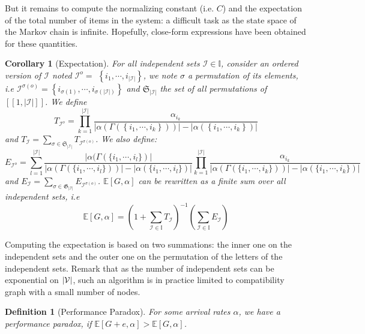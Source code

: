 \documentclass{llncs}
\newtheorem{defin}     {Definition}
\newtheorem{cor}[theo]{Corollary}
\begin{document}
But it remains to compute the normalizing constant (i.e. $C$) and the expectation of the total number of items
 in the system: a difficult task as the state space of the Markov chain is infinite. 
Hopefully, close-form expressions have been obtained for these quantities. 
\begin{cor} [Expectation]\label{cor:exp} \cite{CDFB21}
For all independent sets $\mathcal{I} \in \mathbb{I}$, consider an ordered version of $\mathcal{I}$ noted $\mathcal{I}^o=$ $\left\{i_1, \cdots, i_{|\mathcal{I}|}\right\}$, we note $\sigma$ a permutation of its elements, i.e $\mathcal{I}^{\sigma(o)}=\left\{i_{\sigma(1)}, \cdots, i_{\sigma(|\mathcal{I}|)}\right\}$ and $\mathfrak{S}_{|\mathcal{I}|}$ the set of all permutations of $[\![ 1,|\mathcal{I}| ]\!]$. We define $$
T_{\mathcal{I}^o}=\prod_{k=1}^{|\mathcal{I}|} \frac{\alpha_{i_k}}
{\left| \alpha(\Gamma (\left\{i_1, \cdots, i_k\right\}))\right|
-\left|\alpha(\left\{i_1, \cdots, i_k\right\})\right|}
$$ and $T_{\mathcal{I}}=\sum_{\sigma \in \mathfrak{S}_{|\mathcal{I}|}} T_{\mathcal{I}^{\sigma(o)}}$. 
We also define: 
\[
E_{\mathcal{I}^o}=\sum_{l=1}^{|\mathcal{I}|} 
\frac{\left|\alpha(\Gamma(\{i_1, \cdots, i_l\})\right|}{\left| \alpha(\Gamma( \{ i_1, \cdots, i_l \})) \right|-\left|\alpha(\{i_1, \cdots, i_l\})\right|} \prod_{k=1}^{|\mathcal{I}|} \frac{\alpha_{i_k}}{\left|\alpha(\Gamma(\{i_1, \cdots, i_k\})) \right|-\left|\alpha(\{i_1, \cdots, i_k\}) \right|}
\]
and $E_{\mathcal{I}}=\sum_{\sigma \in \mathfrak{G}_{|\mathcal{I}|}} E_{\mathcal{I}^{\sigma(o)}}$. 
$\mathbb{E}[G, \alpha ]$  can be rewritten as a finite sum over all independent sets, i.e 
\begin{equation}\label{eq:exceptio}
\mathbb{E}[G,\alpha]=\left(1+\sum_{\mathcal{I} \in \mathbb{I}}T_{\mathcal{I}}\right)^{-1}\left(\sum_{\mathcal{I}\in \mathbb{I}} E_{\mathcal{I}}\right)
\end{equation}
\end{cor}

Computing the expectation is based on two summations: the inner one on the
independent sets and the outer one on the permutation of the letters of the independent sets. Remark that 
as the number of independent sets can be exponential on $\vert \cal{V} \vert$, such an algorithm is in practice limited to 
compatibility graph with a small number of nodes. 


\begin{defin} [Performance Paradox] 
For some arrival rates $\alpha$, we have a performance paradox, if  $\mathbb{E} [G+e, \alpha]  > \mathbb{E} [G, \alpha] $. 
\end{defin}
\end{document}
